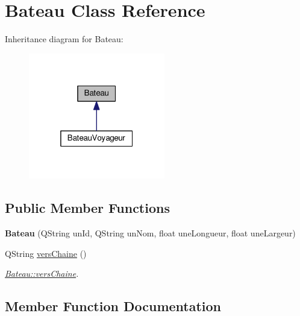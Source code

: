 \hypertarget{class_bateau}{}\section{Bateau Class Reference}
\label{class_bateau}


Inheritance diagram for Bateau\+:\nopagebreak
\begin{figure}[H]
\begin{center}
\leavevmode
\includegraphics[width=169pt]{class_bateau__inherit__graph}
\end{center}
\end{figure}
\subsection*{Public Member Functions}
\begin{DoxyCompactItemize}
\item 
\mbox{\label{class_bateau_a5ea29ce02b632a199385200248a05581}} 
{\bfseries Bateau} (Q\+String un\+Id, Q\+String un\+Nom, float une\+Longueur, float une\+Largeur)
\item 
Q\+String \hyperlink{class_bateau_a392f6a45649a2a35186dfcd1ca58eddc}{vers\+Chaine} ()
\begin{DoxyCompactList}\small\item\em \hyperlink{class_bateau_a392f6a45649a2a35186dfcd1ca58eddc}{Bateau\+::vers\+Chaine}. \end{DoxyCompactList}\end{DoxyCompactItemize}


\subsection{Member Function Documentation}
\mbox{\label{class_bateau_a392f6a45649a2a35186dfcd1ca58eddc}} 
